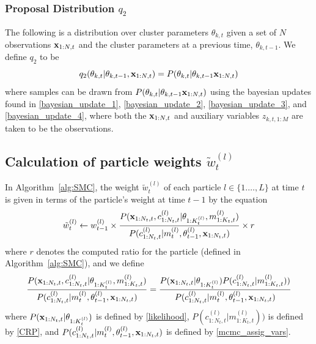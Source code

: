 \documentclass[twocolumn, final]{svjour3}
\begin{document}
\subsubsection{Proposal Distribution $q_{2}$}
\label{sec:smc_proposal_3}

The following is a distribution over cluster parameters $\theta_{k,t}$ given a set of $N$ observations $\bold{x}_{1:N, t}$ and the cluster parameters at a previous time, $\theta_{k,t-1}$. We define $q_{2}$ to be
\begin{equation}
\label{smc_q2_eqn}
q_{2}(\theta_{k,t} | \theta_{k,t-1},\bold{x}_{1:N,t}) = P(\theta_{k,t} | \theta_{k,t-1} \bold{x}_{1:N,t})
\end{equation}
where samples can be drawn from $P(\theta_{k,t} | \theta_{k,t-1} \bold{x}_{1:N,t})$ using the bayesian updates found in \eqref{bayesian_update_1}, \eqref{bayesian_update_2}, \eqref{bayesian_update_3}, and \eqref{bayesian_update_4}, where both the $\bold{x}_{1:N,t}$ and auxiliary variables $z_{k,t,1:M}$ are taken to be the observations.




\subsection{Calculation of particle weights $\tilde{w}_{t}^{(l)}$}
In Algorithm~\ref{alg:SMC}, the weight $\tilde{w}_{t}^{(l)}$ of each particle $l \in \{ 1. \ldots, L \}$ at time $t$ is given in terms of the particle's weight at time $t-1$ by the equation
\begin{equation}
\tilde{w}_{t}^{(l)} \leftarrow w_{t-1}^{(l)} \times \frac{ P(\bold{x}_{1:N_{t},t}, c_{1:N_{t}, t}^{(l)} | \theta_{1:K_{t}^{(l)}}, m_{1:K_{t},t}^{(l)})}	{P(c_{1:N_{t}, t}^{(l)} | m_{t}^{(l)}, \theta_{t-1}^{(l)}, \bold{x}_{1:N_{t},t} ) } \times r
\end{equation}
where $r$ denotes the computed ratio for the particle (defined in Algorithm~\ref{alg:SMC}), and we define
\begin{equation}
\label{smc_weight_eqn}
\begin{split}
& \frac{ P(\bold{x}_{1:N_{t},t}, c_{1:N_{t}, t}^{(l)} | \theta_{1:K_{t}^{(l)}}, m_{1:K_{t},t}^{(l)})}	{P(c_{1:N_{t}, t}^{(l)} | m_{t}^{(l)}, \theta_{t-1}^{(l)}, \bold{x}_{1:N_{t},t} ) }  = 
\frac{P(\bold{x}_{1:N_{t},t} | \theta_{1:K_{t}^{(l)}}) P(c_{1:N_{t}, t}^{(l)} | m_{1:K_{t},t}^{(l)}) )}{P(c_{1:N_{t}, t}^{(l)} | m_{t}^{(l)}, \theta_{t-1}^{(l)}, \bold{x}_{1:N_{t},t})}
\\
%
%
\end{split}
\end{equation}
where $P(\bold{x}_{1:N_{t},t} | \theta_{1:K_{t}^{(l)}})$ is defined by \eqref{likelihood}, $P(c_{1:N_{t}, t}^{(l)} | m_{1:K_{t},t}^{(l)}))$ is defined by \eqref{CRP}, and $P(c_{1:N_{t}, t}^{(l)} | m_{t}^{(l)}, \theta_{t-1}^{(l)}, \bold{x}_{1:N_{t},t})$ is defined by \eqref{mcmc_assig_vars}.
\end{document}

